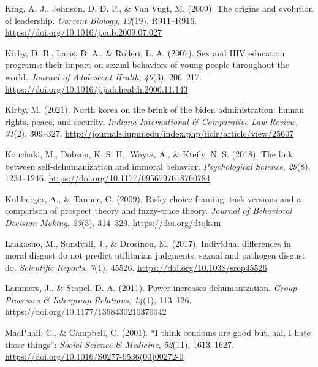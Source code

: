 \documentclass[
  donotrepeattitle,doc, 12pt, a4paper,floatsintext]{apa7}
\newlength{\cslhangindent}
\newlength{\cslentryspacingunit} %
\newenvironment{CSLReferences}[2] %
 {%
  \setlength{\parindent}{0pt}
  \ifodd #1
  \let\oldpar\par
  \def\par{\hangindent=\cslhangindent\oldpar}
  \fi
  \setlength{\parskip}{#2\cslentryspacingunit}
 }%
 {}
\begin{document}
\begin{CSLReferences}{1}{0}
\leavevmode{}%
King, A. J., Johnson, D. D. P., \& Van Vugt, M. (2009). The origins and evolution of leadership. \emph{Current Biology}, \emph{19}(19), R911--R916. \url{https://doi.org/10.1016/j.cub.2009.07.027}

\leavevmode{}%
Kirby, D. B., Laris, B. A., \& Rolleri, L. A. (2007). Sex and HIV education programs: their impact on sexual behaviors of young people throughout the world. \emph{Journal of Adolescent Health}, \emph{40}(3), 206--217. \url{https://doi.org/10.1016/j.jadohealth.2006.11.143}

\leavevmode{}%
Kirby, M. (2021). North korea on the brink of the biden administration: human rights, peace, and security. \emph{Indiana International \& Comparative Law Review}, \emph{31}(2), 309--327. \url{http://journals.iupui.edu/index.php/iiclr/article/view/25607}

\leavevmode{}%
Kouchaki, M., Dobson, K. S. H., Waytz, A., \& Kteily, N. S. (2018). The link between self-dehumanization and immoral behavior. \emph{Psychological Science}, \emph{29}(8), 1234--1246. \url{https://doi.org/10.1177/0956797618760784}

\leavevmode{}%
Kühberger, A., \& Tanner, C. (2009). Risky choice framing: task versions and a comparison of prospect theory and fuzzy-trace theory. \emph{Journal of Behavioral Decision Making}, \emph{23}(3), 314--329. \url{https://doi.org/dtqksm}

\leavevmode{}%
Laakasuo, M., Sundvall, J., \& Drosinou, M. (2017). Individual differences in moral disgust do not predict utilitarian judgments, sexual and pathogen disgust do. \emph{Scientific Reports}, \emph{7}(1), 45526. \url{https://doi.org/10.1038/srep45526}

\leavevmode{}%
Lammers, J., \& Stapel, D. A. (2011). Power increases dehumanization. \emph{Group Processes \& Intergroup Relations}, \emph{14}(1), 113--126. \url{https://doi.org/10.1177/1368430210370042}

\leavevmode{}%
MacPhail, C., \& Campbell, C. (2001). {``I think condoms are good but, aai, I hate those things''}: \emph{Social Science \& Medicine}, \emph{52}(11), 1613--1627. \url{https://doi.org/10.1016/S0277-9536(00)00272-0}


\end{CSLReferences}
\end{document}
